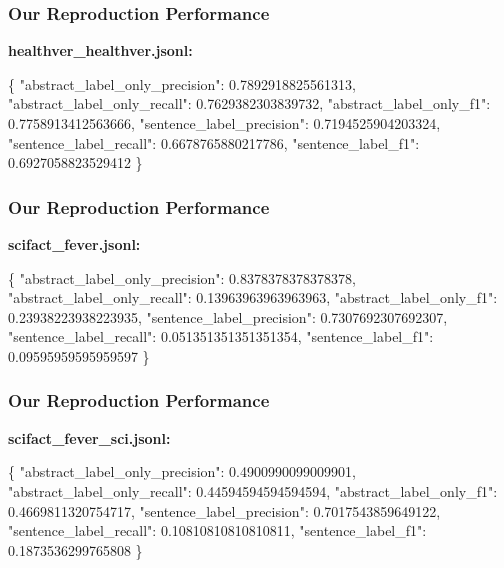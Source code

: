 \documentclass[13.5pt,aspecratio=169, xcolor=dvipsnames]{beamer}
\begin{document}
\begin{frame}[fragile]
    \onehalfspacing
        \frametitle{Our Reproduction Performance}
        \textbf{healthver\_healthver.jsonl:}
\vspace*{-1em} 
\begin{mybox}
\begin{semiverbatim}
\{
    "abstract_label_only_precision": 0.7892918825561313,
    "abstract_label_only_recall": 0.7629382303839732,
    "abstract_label_only_f1": 0.7758913412563666,
    "sentence_label_precision": 0.7194525904203324,
    "sentence_label_recall": 0.6678765880217786,
    "sentence_label_f1": 0.6927058823529412
\}\end{semiverbatim}
\end{mybox}
\end{frame}

\begin{frame}[fragile]
    \onehalfspacing
        \frametitle{Our Reproduction Performance}
        \textbf{scifact\_fever.jsonl:}
\vspace*{-1em} 
\begin{mybox}
\begin{semiverbatim}
\{
    "abstract_label_only_precision": 0.8378378378378378,
    "abstract_label_only_recall": 0.13963963963963963,
    "abstract_label_only_f1": 0.23938223938223935,
    "sentence_label_precision": 0.7307692307692307,
    "sentence_label_recall": 0.051351351351351354,
    "sentence_label_f1": 0.09595959595959597
\}\end{semiverbatim}
\end{mybox}
\end{frame}

\begin{frame}[fragile]
    \onehalfspacing
        \frametitle{Our Reproduction Performance}
        \textbf{scifact\_fever\_sci.jsonl:}
\vspace*{-1em} 
\begin{mybox}
\begin{semiverbatim}
\{
    "abstract_label_only_precision": 0.4900990099009901,
    "abstract_label_only_recall": 0.44594594594594594,
    "abstract_label_only_f1": 0.4669811320754717,
    "sentence_label_precision": 0.7017543859649122,
    "sentence_label_recall": 0.10810810810810811,
    "sentence_label_f1": 0.1873536299765808
\}\end{semiverbatim}
\end{mybox}
\end{frame}
\end{document}
